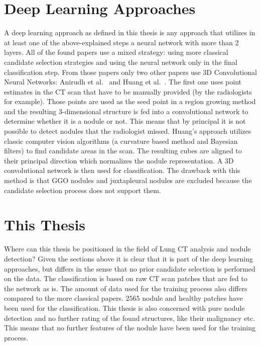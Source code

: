 \documentclass[main.tex]{subfiles}
\begin{document}
\section{Deep Learning Approaches}
A deep learning approach as defined in this thesis is any approach that utilizes in at least one of the above-explained steps a neural network with more than $2$ layers. All of the found papers use a mixed strategy: using more classical candidate selection strategies and using the neural network only in the final classification step. From those papers only two other papers use 3D Convolutional Neural Networks: Anirudh et al.~\cite{anirudh2016lung} and Huang et al.~\cite{huang2017lung}. The first one uses point estimates in the CT scan that have to be manually provided (by the radiologists for example). Those points are used as the seed point in a region growing method and the resulting 3-dimensional structure is fed into a convolutional network to determine whether it is a nodule or not. This means that by principal it is not possible to detect nodules that the radiologist missed. Huang's approach utilizes classic computer vision algorithms (a curvature based method and Bayesian filters) to find candidate areas in the scan. The resulting cubes are aligned to their principal direction which normalizes the nodule representation. A 3D convolutional network is then used for classification. The drawback with this method is that GGO nodules and juxtapleural nodules are excluded because the candidate selection process does not support them.


\section{This Thesis}
Where can this thesis be positioned in the field of Lung CT analysis and nodule detection? Given the sections above it is clear that it is part of the deep learning approaches, but differs in the sense that no prior candidate selection is performed on the data. The classification is based on raw CT scan patches that are fed to the network as is. The amount of data used for the training process also differs compared to the more classical papers. $2565$ nodule and healthy patches have been used for the classification. This thesis is also concerned with pure nodule detection and no further rating of the found structures, like their malignancy etc. This means that no further features of the nodule have been used for the training process.
\end{document}
